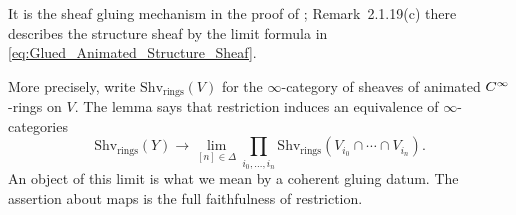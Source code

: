 
It is the sheaf gluing mechanism in the proof of
\citet[Proposition~2.1.18]{Steffens_Representability_Elliptic_Moduli};
Remark~2.1.19(c) there describes the structure sheaf by the limit
formula in \eqref{eq:Glued_Animated_Structure_Sheaf}.

More precisely, write $\mathrm{Shv}_{\mathrm{rings}}(V)$ for the
$\infty$-category of sheaves of animated $C^\infty$-rings on $V$.
The lemma says that restriction induces an equivalence of
$\infty$-categories
\[
 \mathrm{Shv}_{\mathrm{rings}}(Y)\longrightarrow
 \lim_{[n]\in\Delta}\prod_{i_0,\ldots,i_n}
 \mathrm{Shv}_{\mathrm{rings}}(V_{i_0}\cap\cdots\cap V_{i_n}).
\]
An object of this limit is what we mean by a coherent gluing datum.
The assertion about maps is the full faithfulness of restriction.

